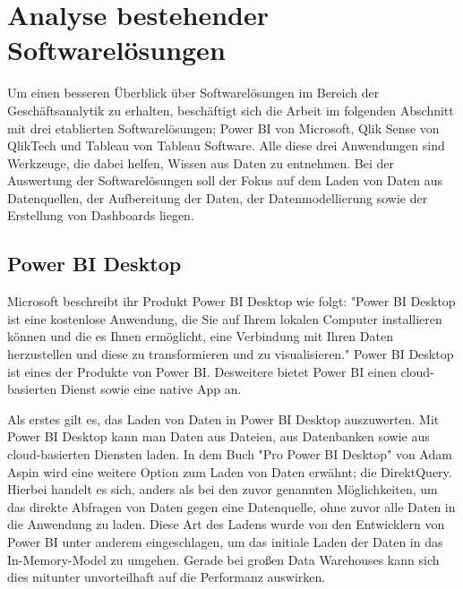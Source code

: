 \chapter{Analyse bestehender Softwarelösungen}
\label{chap:analysebestehendersoftwareloesungen}

Um einen besseren Überblick über Softwarelösungen im Bereich der Geschäftsanalytik zu erhalten, beschäftigt sich
die Arbeit im folgenden Abschnitt mit drei etablierten Softwarelösungen; Power BI von
Microsoft, Qlik Sense von QlikTech und Tableau von Tableau Software. Alle diese drei Anwendungen sind Werkzeuge,
die dabei helfen, Wissen aus Daten zu entnehmen. Bei der Auswertung der Softwarelösungen soll der Fokus auf dem Laden
von Daten aus Datenquellen, der Aufbereitung der Daten, der Datenmodellierung sowie der Erstellung von Dashboards liegen.

\section{Power BI Desktop}
\label{sec:powerbidesktop}
Microsoft beschreibt ihr Produkt Power BI Desktop wie folgt: "Power BI Desktop ist eine kostenlose Anwendung,
die Sie auf Ihrem lokalen Computer installieren können und die es Ihnen ermöglicht, eine Verbindung mit Ihren
Daten herzustellen und diese zu transformieren und zu visualisieren."\cite{MicrosoftPowerBIDesktopDocs}
Power BI Desktop ist eines der Produkte von Power BI. Desweitere bietet Power BI einen cloud-basierten Dienst
sowie eine native App an.\cite{WikiPowerBI}

Als erstes gilt es, das Laden von Daten in Power BI Desktop auszuwerten. Mit Power BI Desktop kann man 
Daten aus Dateien, aus Datenbanken sowie aus cloud-basierten Diensten laden. In dem Buch "Pro Power BI Desktop"
von Adam Aspin wird eine weitere Option zum Laden von Daten erwähnt; die DirektQuery.
Hierbei handelt es sich, anders als bei den zuvor genannten Möglichkeiten, um das direkte
Abfragen von Daten gegen eine Datenquelle, ohne zuvor alle Daten in die Anwendung zu laden.\cite[S. 111]{ProPowerBIDesktop}
Diese Art des Ladens wurde von den Entwicklern von Power BI unter anderem eingeschlagen,
um das initiale Laden der Daten in das In-Memory-Model zu umgehen. Gerade bei großen Data Warehouses
kann sich dies mitunter unvorteilhaft auf die Performanz auswirken.

